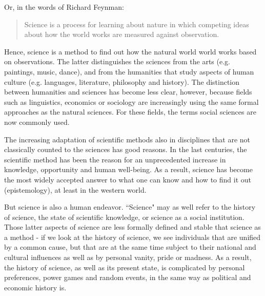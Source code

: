 \documentclass{tufte-book}
\begin{document}
\noindent Or, in the words of Richard Feynman:

\begin{quote}
Science is a process for learning about nature in which competing ideas about how the world works are measured against observation.
\end{quote}

Hence, science is a method to find out how the natural world world works based on observations. The latter distinguishes the sciences from the arts (e.g. paintings, music, dance), and from the humanities that study aspects of human culture (e.g. languages, literature, philosophy and history). The distinction between humanities and sciences has become less clear, however, because fields such as linguistics, economics or sociology are increasingly using the same formal approaches as the natural sciences. For these fields, the terms social sciences are now commonly used. 

The increasing adaptation of scientific methods also in disciplines that are not classically counted to the sciences has good reasons. In the last centuries, the scientific method has been the reason for an unprecedented increase in knowledge, opportunity and human well-being. As a result, science has become the most widely accepted answer to what one can know and how to find it out (epistemology), at least in the western world. 


But science is also a human endeavor. ``Science" may as well refer to the history of science, the state of scientific knowledge, or science as a social institution. Those latter aspects of science are less formally defined and stable that science as a method - if we look at the history of science, we see individuals that are unified by a common cause, but that are at the same time subject to their national and cultural influences as well as by personal vanity, pride or madness. As a result, the history of science, as well as its present state, is complicated by personal preferences, power games and random events, in the same way as political and economic history is. 
\end{document}
